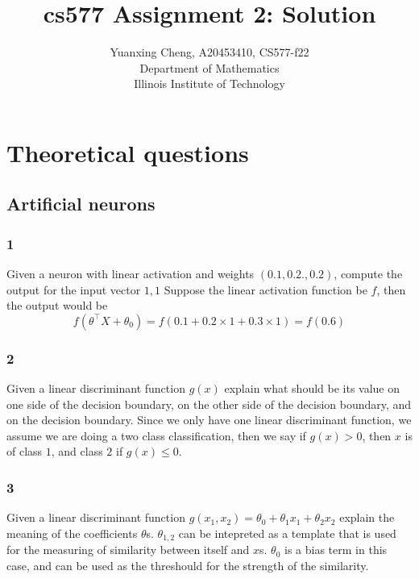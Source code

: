 \documentclass{article}
\title{cs577 Assignment 2: Solution}
\author{Yuanxing Cheng, A20453410, CS577-f22\\ Department of Mathematics \\Illinois Institute of Technology}
\begin{document}
\maketitle

\section*{Theoretical questions}

\subsection*{Artificial neurons}
\subsubsection*{1}
\begin{myleftlinebox}
    Given a neuron with linear activation and weights \((0.1,0.2.,0.2)\), compute the output for the input vector \(1,1\)
    \tcblower
    Suppose the linear activation function be \(f\), then the output would be
    \[f(\theta^\top X+\theta_0)=f(0.1+0.2\times1+0.3\times1)=f(0.6)\]
\end{myleftlinebox}

\subsubsection*{2}
\begin{myleftlinebox}
    Given a linear discriminant function \(g(x)\) explain what should be its value on one side of the decision boundary, on the other side of the decision boundary, and on the decision boundary.
    \tcblower
    Since we only have one linear discriminant function, we assume we are doing a two class classification, then we say if \(g(x)>0\), then \(x\) is of class \(1\), and class \(2\) if \(g(x)\leq 0\).
\end{myleftlinebox}

\subsubsection*{3}
\begin{myleftlinebox}
    Given a linear discriminant function \(g(x_1,x_2) = \theta_0+\theta_1 x_1+\theta_2 x_2\) explain the meaning of the coefficients \(\theta\)s.
    \tcblower
    \(\theta_{1,2}\) can be intepreted as a template that is used for the measuring of similarity between itself and \(x\)s. \(\theta_0\) is a bias term in this case, and can be used as the threshould for the strength of the similarity.
\end{myleftlinebox}
\end{document}
